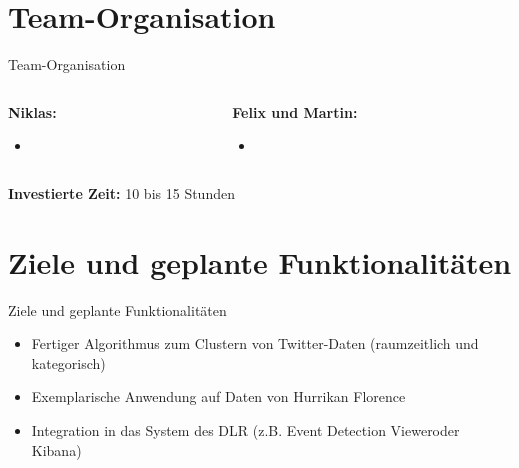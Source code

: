 \documentclass[12pt, xcolor={usenames,dvipsnames,svgnames,x11names,table}]{beamer}
\begin{document}
	
	\section{Team-Organisation}
	\begin{frame}{Team-Organisation}
		\begin{columns}[onlytextwidth]
			\begin{column}{.5\textwidth}
				\textbf{Niklas:}
				\begin{itemize}
					\item
				\end{itemize}
			\end{column}
			
			\begin{column}{.5\textwidth}
				\textbf{Felix und Martin:}
				\begin{itemize}
					\item
				\end{itemize}
			\end{column}
		\end{columns}\bigskip\bigskip
		\textbf{Investierte Zeit:} 10 bis 15 Stunden
	\end{frame}
	
	
	\section{Ziele und geplante Funktionalitäten}
	\begin{frame}{Ziele und geplante Funktionalitäten}{}
		\begin{itemize}
			\item Fertiger Algorithmus zum Clustern von Twitter-Daten (raumzeitlich und kategorisch)
			\item Exemplarische Anwendung auf Daten von Hurrikan Florence
			\item Integration in das System des DLR (z.B. \glqq Event Detection Viewer\grqq oder \glqq Kibana\grqq)
		\end{itemize}
	\end{frame}
	
	
\end{document}

